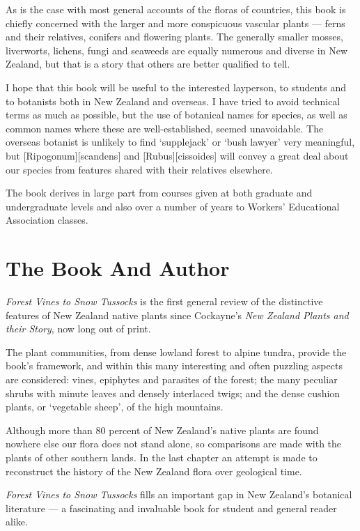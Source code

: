 As is the case with most general accounts of the floras of countries, this book is chiefly concerned with the larger and more conspicuous vascular plants --- ferns and their relatives, conifers and flowering plants.
The generally smaller mosses, liverworts, lichens, fungi and seaweeds are equally numerous and diverse in New Zealand, but that is a story that others are better qualified to tell.

I hope that this book will be useful to the interested layperson, to students and to botanists both in New Zealand and overseas.
I have tried to avoid technical terms as much as possible, but the use of botanical names for species, as well as common names where these are well-established, seemed unavoidable.
The overseas botanist is unlikely to find `supplejack' or `bush lawyer' very meaningful, but [Ripogonum][scandens] and [Rubus][cissoides] will convey a great deal about our species from features shared with their relatives elsewhere.

The book derives in large part from courses given at both graduate and undergraduate levels and also over a number of years to Workers' Educational Association classes.

\section*{The Book And Author}

\emph{Forest Vines to Snow Tussocks} is the first general review of the distinctive features of New Zealand native plants since Cockayne's \emph{New Zealand Plants and their Story}, now long out of print.

The plant communities, from dense lowland forest to alpine tundra, provide the book's framework, and within this many interesting and often puzzling aspects are considered: vines, epiphytes and parasites of the forest; the many peculiar shrubs with minute leaves and densely interlaced twigs; and the dense cushion plants, or `vegetable sheep', of the high mountains.

Although more than 80 percent of New Zealand's native plants are found nowhere else our flora does not stand alone, so comparisons are made with the plants of other southern lands.
In the last chapter an attempt is made to reconstruct the history of the New Zealand flora over geological time.

\emph{Forest Vines to Snow Tussocks} fills an important gap in New Zealand's botanical literature — a fascinating and invaluable book for student and general reader alike.

